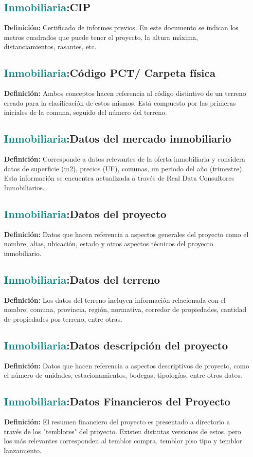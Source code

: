 \documentclass[12pt]{article}
\begin{document}
\subsection{\textcolor{teal}{Inmobiliaria}:{CIP}}
\textbf{Definición:} Certificado de informes previos. En este documento se indican los metros cuadrados que puede tener el proyecto, la altura máxima, distanciamientos, rasantes, etc.
\subsection{\textcolor{teal}{Inmobiliaria}:{Código PCT/ Carpeta física}}
\textbf{Definición:} Ambos conceptos hacen referencia al código distintivo de un terreno creado para la clasificación de estos mismos. Está compuesto por las primeras iniciales de la comuna, seguido del número del terreno.
\subsection{\textcolor{teal}{Inmobiliaria}:{Datos del mercado inmobiliario}}
\textbf{Definición:} Corresponde a datos relevantes de la oferta inmobiliaria y considera datos de superficie (m2), precios (UF), comunas, un periodo del año (trimestre). Esta información se encuentra actualizada a través de Real Data Consultores Inmobiliarios.
\subsection{\textcolor{teal}{Inmobiliaria}:{Datos del proyecto}}
\textbf{Definición:} Datos que hacen referencia a aspectos generales del proyecto como el nombre, alias, ubicación, estado y otros aspectos técnicos del proyecto inmobiliario.
\subsection{\textcolor{teal}{Inmobiliaria}:{Datos del terreno}}
\textbf{Definición:} Los datos del terreno incluyen información relacionada con el nombre, comuna, provincia, región, normativa, corredor de propiedades, cantidad de propiedades por terreno, entre otras.
\subsection{\textcolor{teal}{Inmobiliaria}:{Datos descripción del proyecto}}
\textbf{Definición:} Datos que hacen referencia a aspectos descriptivos de proyecto, como el número de unidades, estacionamientos, bodegas, tipologías, entre otros datos.
\subsection{\textcolor{teal}{Inmobiliaria}:{Datos Financieros del Proyecto}}
\textbf{Definición:} El resumen financiero del proyecto es presentado a directorio a través de los "temblores" del proyecto. Existen distintas versiones de estos, pero los más relevantes corresponden al temblor compra, temblor piso tipo y temblor lanzamiento.
\end{document}
